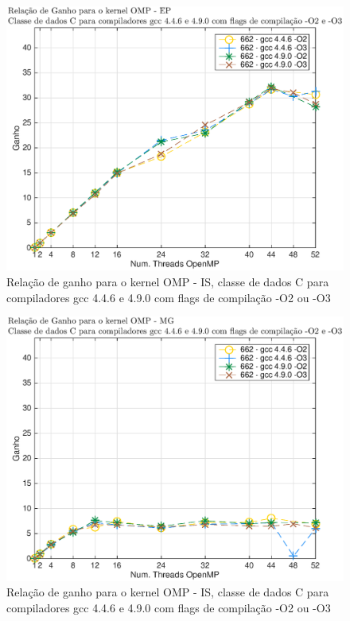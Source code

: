 \documentclass[conference,compsoc]{IEEEtran}
\begin{document}
\begin{figure}[H]
\centering
\includegraphics[width=1.1\columnwidth]{EPS/OMP/ganho_compiladores_ep.eps}
\caption{Relação de ganho para o kernel OMP - IS, classe de dados C para  compiladores gcc 4.4.6 e 4.9.0 com flags de compilação -O2 ou -O3}
\label{ganho_compiladores_ep_c}
\end{figure}

\begin{figure}[H]
\centering
\includegraphics[width=1.1\columnwidth]{EPS/OMP/ganho_compiladores_mg.eps}
\caption{Relação de ganho para o kernel OMP - IS, classe de dados C para  compiladores gcc 4.4.6 e 4.9.0 com flags de compilação -O2 ou -O3}
\label{ganho_compiladores_mg_c}
\end{figure}
\end{document}
